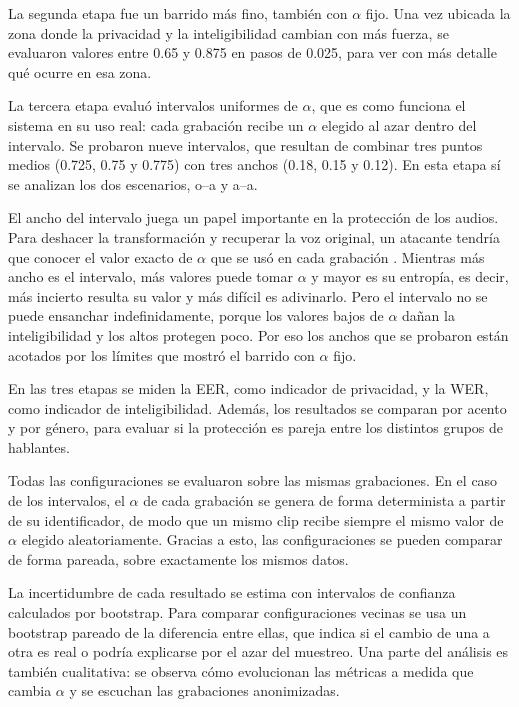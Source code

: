 \documentclass[10pt,twocolumn]{article}
\newcommand{\parencite}[1]{\citep{#1}}
\begin{document}
La segunda etapa fue un barrido más fino, también con $\alpha$ fijo. Una vez ubicada la zona donde la privacidad y la inteligibilidad cambian con más fuerza, se evaluaron valores entre 0.65 y 0.875 en pasos de 0.025, para ver con más detalle qué ocurre en esa zona.

La tercera etapa evaluó intervalos uniformes de $\alpha$, que es como funciona el sistema en su uso real: cada grabación recibe un $\alpha$ elegido al azar dentro del intervalo. Se probaron nueve intervalos, que resultan de combinar tres puntos medios (0.725, 0.75 y 0.775) con tres anchos (0.18, 0.15 y 0.12). En esta etapa sí se analizan los dos escenarios, o--a y a--a.

El ancho del intervalo juega un papel importante en la protección de los audios. Para deshacer la transformación y recuperar la voz original, un atacante tendría que conocer el valor exacto de $\alpha$ que se usó en cada grabación \parencite{patino2021}. Mientras más ancho es el intervalo, más valores puede tomar $\alpha$ y mayor es su entropía, es decir, más incierto resulta su valor y más difícil es adivinarlo. Pero el intervalo no se puede ensanchar indefinidamente, porque los valores bajos de $\alpha$ dañan la inteligibilidad y los altos protegen poco. Por eso los anchos que se probaron están acotados por los límites que mostró el barrido con $\alpha$ fijo.

En las tres etapas se miden la EER, como indicador de privacidad, y la WER, como indicador de inteligibilidad. Además, los resultados se comparan por acento y por género, para evaluar si la protección es pareja entre los distintos grupos de hablantes.

Todas las configuraciones se evaluaron sobre las mismas grabaciones. En el caso de los intervalos, el $\alpha$ de cada grabación se genera de forma determinista a partir de su identificador, de modo que un mismo clip recibe siempre el mismo valor de $\alpha$ elegido aleatoriamente. Gracias a esto, las configuraciones se pueden comparar de forma pareada, sobre exactamente los mismos datos.

La incertidumbre de cada resultado se estima con intervalos de confianza calculados por bootstrap. Para comparar configuraciones vecinas se usa un bootstrap pareado de la diferencia entre ellas, que indica si el cambio de una a otra es real o podría explicarse por el azar del muestreo. Una parte del análisis es también cualitativa: se observa cómo evolucionan las métricas a medida que cambia $\alpha$ y se escuchan las grabaciones anonimizadas.
\end{document}
